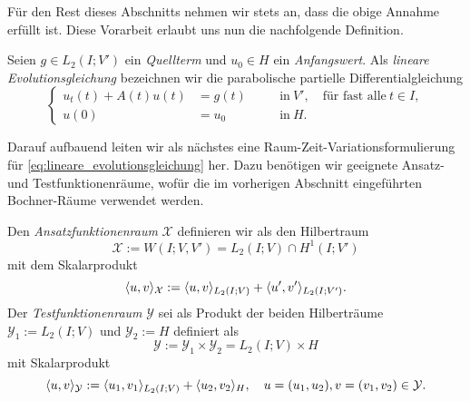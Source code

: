 \documentclass[../main.tex]{subfiles}
\begin{document}
Für den Rest dieses Abschnitts nehmen wir stets an, dass die obige Annahme erfüllt ist.
Diese Vorarbeit erlaubt uns nun die nachfolgende Definition.

\begin{Definition}
\label{definition:lineare_evolutionsgleichung}
    Seien $g \in L_{2}(I; V')$ ein \emph{Quellterm} und $u_{0} \in H$ ein \emph{Anfangswert}.
    Als \emph{lineare Evolutionsgleichung} bezeichnen wir die parabolische partielle Differentialgleichung
    \begin{equation}
        \label{eq:lineare_evolutionsgleichung}
        \left\{
        \begin{aligned}
            u_{t}(t) + A(t) u(t) &= g(t)     \quad&&\text{in}~V', \quad \text{für fast alle}~t \in I, \\
            u(0) &= u_{0}                    \quad&&\text{in}~H.
        \end{aligned}
        \right.
    \end{equation}
\end{Definition}

Darauf aufbauend leiten wir als nächstes eine Raum-Zeit-Variationsformulierung für \cref{eq:lineare_evolutionsgleichung} her.
Dazu benötigen wir geeignete Ansatz- und Testfunktionenräume, wofür die im vorherigen Abschnitt eingeführten Bochner-Räume verwendet werden.

\begin{Definition}
\label{definition:ansatz_und_testraum}
    Den \emph{Ansatzfunktionenraum} $\mathcal X$ definieren wir als den Hilbertraum
    \begin{equation}
    \label{eq:ansatzraum_X}
        \mathcal X := W(I; V, V') = L_{2}(I; V) \cap H^{1}(I; V')
    \end{equation}
    mit dem Skalarprodukt
    \begin{equation}
    \label{eq:ansatzraum_skalarprodukt}
        \langle u,v\rangle_{\mathcal X} := \langle u,v\rangle_{L_{2}(I; V)} + \langle u',v'\rangle_{L_{2}(I; V')}.
    \end{equation}
    Der \emph{Testfunktionenraum} $\mathcal Y$ sei als Produkt der beiden Hilberträume $\mathcal Y_{1} := L_{2}(I; V)$ und $\mathcal Y_{2} := H$ definiert als
    \begin{equation}
    \label{eq:testraum_Y}
        \mathcal Y := \mathcal Y_{1} \times \mathcal Y_{2} = L_{2}(I; V) \times H
    \end{equation}
    mit Skalarprodukt
    \begin{equation}
        \label{eq:testraum_skalarprodukt}
        \langle u,v\rangle_{\mathcal Y} := \langle u_{1},v_{1}\rangle_{L_{2}(I; V)} + \langle u_{2},v_{2}\rangle_{H}, \quad  u = (u_{1}, u_{2}), v = (v_{1}, v_{2}) \in \mathcal Y.
    \end{equation}
\end{Definition}
\end{document}

